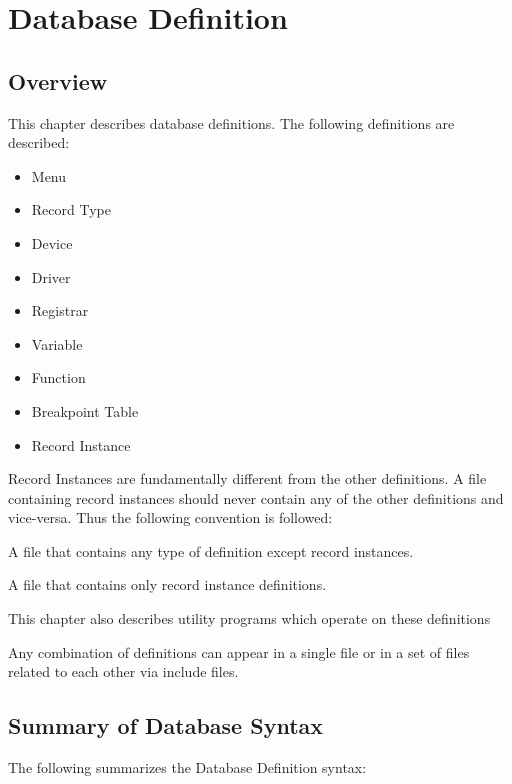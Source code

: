 \chapter{Database Definition}

\section{Overview}

This chapter describes database definitions. The following definitions are described:

\begin{itemize}
\item Menu
\item Record Type
\item Device
\item Driver
\item Registrar
\item Variable
\item Function
\item Breakpoint Table
\item Record Instance
\end{itemize}

Record Instances are fundamentally different from the other definitions. A file containing record instances should never 
contain any of the other definitions and vice-versa. Thus the following convention is followed:

\begin{description}
\item [Database Definition File] A file that contains any type of definition except record instances.

\item [Record Instance File] A file that contains only record instance definitions.
\end{description}

This chapter also describes utility programs which operate on these definitions

Any combination of definitions can appear in a single file or in a set of files related to each other via include files.

\section{Summary of Database Syntax}

The following summarizes the Database Definition syntax:

